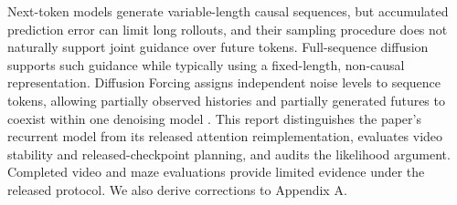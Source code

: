 Next-token models generate variable-length causal sequences, but accumulated prediction error can limit long rollouts, and their sampling procedure does not naturally support joint guidance over future tokens. Full-sequence diffusion supports such guidance while typically using a fixed-length, non-causal representation. Diffusion Forcing assigns independent noise levels to sequence tokens, allowing partially observed histories and partially generated futures to coexist within one denoising model \cite{chen2025diffusion}. This report distinguishes the paper's recurrent model from its released attention reimplementation, evaluates video stability and released-checkpoint planning, and audits the likelihood argument. Completed video and maze evaluations provide limited evidence under the released protocol. We also derive corrections to Appendix A.

